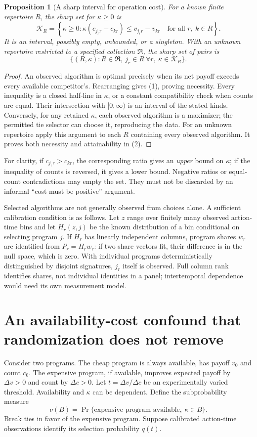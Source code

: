 \documentclass[11pt]{article}
\newtheorem{proposition}[theorem]{Proposition}
\theoremstyle{remark}
\begin{document}
\begin{proposition}[A sharp interval for operation cost]
For a known finite repertoire $R$, the sharp set for $\kappa\geq0$ is
\[
 \mathcal K_R=\left\{\kappa\geq0:
 \kappa(c_{j_r r}-c_{kr})\leq v_{j_r r}-v_{kr}
 \quad\text{for all }r,\ k\in R\right\}.                \tag{1}
\]
It is an interval, possibly empty, unbounded, or a singleton. With an unknown repertoire restricted to a specified collection $\mathfrak R$, the sharp set of pairs is
\[
 \{(R,\kappa):R\in\mathfrak R,\ j_r\in R\ \forall r,
                         \ \kappa\in\mathcal K_R\}.      \tag{2}
\]
\end{proposition}
\begin{proof}
An observed algorithm is optimal precisely when its net payoff exceeds every available competitor's. Rearranging gives (1), proving necessity. Every inequality is a closed half-line in $\kappa$, or a constant compatibility check when counts are equal. Their intersection with $[0,\infty)$ is an interval of the stated kinds. Conversely, for any retained $\kappa$, each observed algorithm is a maximizer; the permitted tie selector can choose it, reproducing the data. For an unknown repertoire apply this argument to each $R$ containing every observed algorithm. It proves both necessity and attainability in (2).
\end{proof}

For clarity, if $c_{j_r r}>c_{kr}$, the corresponding ratio gives an \emph{upper} bound on $\kappa$; if the inequality of counts is reversed, it gives a lower bound. Negative ratios or equal-count contradictions may empty the set. They must not be discarded by an informal ``cost must be positive'' argument.

Selected algorithms are not generally observed from choices alone. A sufficient calibration condition is as follows. Let $z$ range over finitely many observed action-time bins and let $H_r(z,j)$ be the known distribution of a bin conditional on selecting program $j$. If $H_r$ has linearly independent columns, program shares $w_r$ are identified from $P_r=H_rw_r$: if two share vectors fit, their difference is in the null space, which is zero. With individual programs deterministically distinguished by disjoint signatures, $j_r$ itself is observed. Full column rank identifies shares, not individual identities in a panel; intertemporal dependence would need its own measurement model.

\section{An availability-cost confound that randomization does not remove}
Consider two programs. The cheap program is always available, has payoff $v_0$ and count $c_0$. The expensive program, if available, improves expected payoff by $\Delta v>0$ and count by $\Delta c>0$. Let $t=\Delta v/\Delta c$ be an experimentally varied threshold. Availability and $\kappa$ can be dependent. Define the subprobability measure
\[
 \nu(B)=\Pr\{\text{expensive program available},\ \kappa\in B\}.
\]
Break ties in favor of the expensive program. Suppose calibrated action-time observations identify its selection probability $q(t)$.
\end{document}
